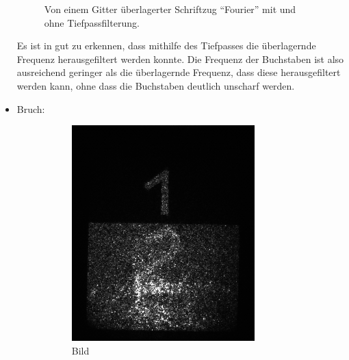 \documentclass[
	a4paper,
	12pt,
	pagesize,
	ngerman
]{scrartcl}
\begin{document}
\begin{itemize}
\begin{figure}[H]
	        \caption%
	        {
					Von einem Gitter überlagerter Schriftzug \enquote{Fourier} mit und ohne Tiefpassfilterung.
					}
	        \label{fig_4_fourier}
	    \end{figure}
	Es ist in  gut zu erkennen, dass mithilfe des Tiefpasses die überlagernde Frequenz herausgefiltert werden konnte.
	Die Frequenz der Buchstaben ist also ausreichend geringer als die überlagernde Frequenz, dass diese herausgefiltert werden kann, ohne dass die Buchstaben deutlich unscharf werden.
	\item{Bruch:}
	\begin{figure}[H]
        \centering
        \begin{subfigure}[b]{0.475\textwidth}
            \centering
            \includegraphics[width=\textwidth]{raw/4/4_halb_gitter}
            \caption%
            {Bild}
            \label{fig_4_halb_gitter}
        \end{subfigure}
        \hfill
        \begin{subfigure}[b]{0.475\textwidth}
            \centering

\end{subfigure}
\end{figure}
\end{itemize}
\end{document}
